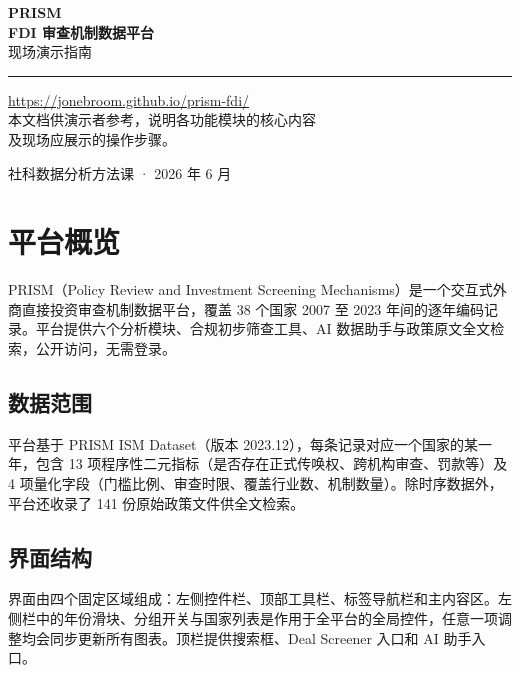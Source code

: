 \documentclass[12pt,a4paper]{article}
\begin{document}
\begin{titlepage}
  \centering
  \vspace*{3cm}
  {\Huge\bfseries\color{prismclay} PRISM}\\[0.4em]
  {\LARGE\bfseries\color{darkink} FDI 审查机制数据平台}\\[0.6em]
  {\large\color{gray} 现场演示指南}

  \vspace{1.5cm}
  \color{midgray}\rule{0.5\linewidth}{1pt}\color{black}
  \vspace{1.5cm}

  {\normalsize\url{https://jonebroom.github.io/prism-fdi/}}\\[0.6em]
  {\normalsize\color{gray} 本文档供演示者参考，说明各功能模块的核心内容\\及现场应展示的操作步骤。}

  \vfill
  {\small\color{gray} 社科数据分析方法课 · 2026 年 6 月}
\end{titlepage}

\tableofcontents
\newpage

\section{平台概览}

PRISM（Policy Review and Investment Screening Mechanisms）是一个交互式外商直接投资审查机制数据平台，覆盖 38 个国家 2007 至 2023 年间的逐年编码记录。平台提供六个分析模块、合规初步筛查工具、AI 数据助手与政策原文全文检索，公开访问，无需登录。

\subsection{数据范围}

平台基于 PRISM ISM Dataset（版本 2023.12），每条记录对应一个国家的某一年，包含 13 项程序性二元指标（是否存在正式传唤权、跨机构审查、罚款等）及 4 项量化字段（门槛比例、审查时限、覆盖行业数、机制数量）。除时序数据外，平台还收录了 141 份原始政策文件供全文检索。

\subsection{界面结构}

界面由四个固定区域组成：左侧控件栏、顶部工具栏、标签导航栏和主内容区。左侧栏中的年份滑块、分组开关与国家列表是作用于全平台的全局控件，任意一项调整均会同步更新所有图表。顶栏提供搜索框、Deal Screener 入口和 AI 助手入口。
\end{document}
